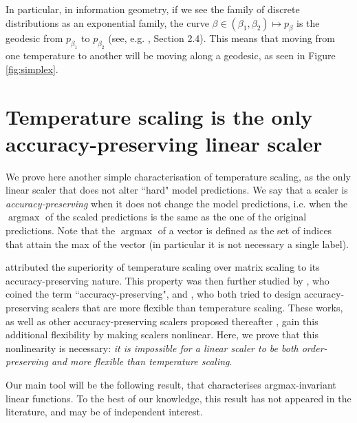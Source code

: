 \documentclass[10pt,dvipsnames]{article}
\DeclareMathOperator*{\argmax}{argmax}
\theoremstyle{plain}
\theoremstyle{definition}
\theoremstyle{remark}
\begin{document}
 In particular, in information geometry, if we see the family of discrete distributions as an exponential family, the curve $\beta \in (\beta_1, \beta_2) \mapsto p_{\beta}$ is the geodesic from $p_{\beta_1}$ to $p_{\beta_2}$ (see, e.g. \citealp{amari2016information}, Section 2.4). This means that moving from one temperature to another will be moving along a geodesic, as seen in Figure \ref{fig:simplex}.

\section{Temperature scaling is the only accuracy-preserving linear scaler}
\label{sec:consistency}
We prove here another simple characterisation of temperature scaling, as the only linear scaler that does not alter ``hard" model predictions. We say that a scaler is \emph{accuracy-preserving} when it does not change the model predictions, i.e. when the $\argmax$ of the scaled predictions is the same as the one of the original predictions. Note that the  $\argmax$ of a vector is defined as the set of indices that attain the max of the vector (in particular it is not necessary a single label).

\citet{guo2017calibration} attributed the superiority of temperature scaling over matrix scaling to its accuracy-preserving nature. This property was then further studied by \citet{zhang2020mix}, who coined the term ``accuracy-preserving", and \citet{rahimi2020intra}, who both tried to design accuracy-preserving scalers that are more flexible than temperature scaling. These works, as well as other accuracy-preserving scalers proposed thereafter \citep{esaki2024accuracy,zhang2025instance}, gain this additional flexibility by making scalers nonlinear. Here, we prove that this nonlinearity is necessary:  \emph{it is impossible for a linear scaler to be both order-preserving and more flexible than temperature scaling}.

Our main tool will be the following result, that characterises argmax-invariant linear functions. To the best of our knowledge, this result has not appeared in the literature, and may be of independent interest.
\end{document}

